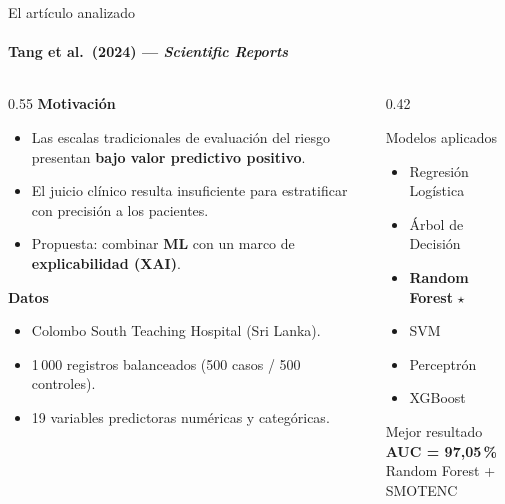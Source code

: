 \documentclass[aspectratio=169,11pt]{beamer}
\begin{document}
\begin{frame}[shrink=35]{El artículo analizado}
  \framesubtitle{Tang et al.\ (2024) — \textit{Scientific Reports}}
  \begin{columns}[T]
    \begin{column}{0.55\textwidth}
      \textbf{\color{PUCgold}Motivación}
      \begin{itemize}
        \item Las escalas tradicionales de evaluación del riesgo presentan \textbf{bajo valor predictivo positivo}.
        \item El juicio clínico resulta insuficiente para estratificar con precisión a los pacientes.
        \item Propuesta: combinar \textbf{ML} con un marco de \textbf{explicabilidad (XAI)}.
      \end{itemize}
      \vspace{0.8em}
      \textbf{\color{PUCgold}Datos}
      \begin{itemize}
        \item Colombo South Teaching Hospital (Sri Lanka).
        \item 1\,000 registros balanceados (500 casos / 500 controles).
        \item 19 variables predictoras numéricas y categóricas.
      \end{itemize}
    \end{column}
    \begin{column}{0.42\textwidth}
      \begin{block}{Modelos aplicados}
        \small
        \begin{itemize}
          \item Regresión Logística
          \item Árbol de Decisión
          \item \textbf{Random Forest} {\color{PUCgold}$\star$}
          \item SVM
          \item Perceptrón
          \item XGBoost
        \end{itemize}
      \end{block}
      \begin{alertblock}{Mejor resultado}
        \centering
        \textbf{AUC = 97,05\,\%}\\
        \small Random Forest + SMOTENC
      \end{alertblock}
    \end{column}
  \end{columns}
\end{frame}
\end{document}

